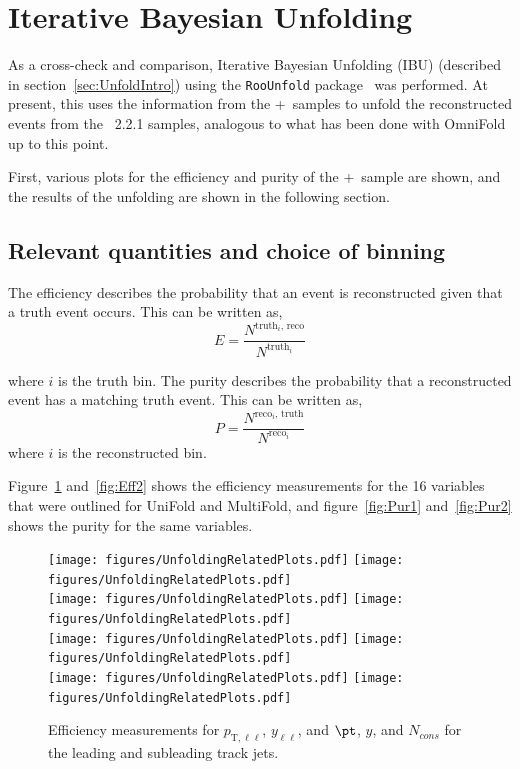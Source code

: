 \section{Iterative Bayesian Unfolding}
\label{app:IBU}

As a cross-check and comparison, %
Iterative Bayesian Unfolding (IBU) (described in section~\ref{sec:UnfoldIntro}) using the \texttt{RooUnfold} package~\cite{Adye:2011gm} was performed. At present, this uses the information from the \powheg+\pythia~samples to unfold the reconstructed events from the \sherpa~2.2.1 samples, analogous to what has been done with OmniFold up to this point.

First, various plots for the efficiency and purity of the \powheg+\pythia~sample are shown, and the results of the unfolding are shown in the following section.

\subsection{Relevant quantities and choice of binning}
The efficiency describes the probability that an event is reconstructed given that a truth event occurs. This can be written as,
\begin{equation}
  E=\frac{N^{\text{truth$_i$, reco}}}{N^{\text{truth$_i$}}}
\end{equation}

where $i$ is the truth bin. The purity describes the probability that a reconstructed event has a matching truth event. This can be written as,
\begin{equation}
  P=\frac{N^{\text{reco$_i$, truth}}}{N^{\text{reco$_i$}}}
\end{equation}
where $i$ is the reconstructed bin.

Figure~\ref{fig:Eff1} and~\ref{fig:Eff2} shows the efficiency measurements for the 16 variables that were outlined for UniFold and MultiFold, and figure~\ref{fig:Pur1} and~\ref{fig:Pur2} shows the purity for the same variables.

\begin{figure}[h!]
  \centering
  \texttt{[image: figures/UnfoldingRelatedPlots.pdf]}
  \texttt{[image: figures/UnfoldingRelatedPlots.pdf]} \\
  \texttt{[image: figures/UnfoldingRelatedPlots.pdf]}
  \texttt{[image: figures/UnfoldingRelatedPlots.pdf]} \\
  \texttt{[image: figures/UnfoldingRelatedPlots.pdf]}
  \texttt{[image: figures/UnfoldingRelatedPlots.pdf]} \\
  \texttt{[image: figures/UnfoldingRelatedPlots.pdf]}
  \texttt{[image: figures/UnfoldingRelatedPlots.pdf]}
  \caption{Efficiency measurements for $p_{\text{T},\ell\ell}$, $y_{\ell\ell}$, and $\pt$, $y$, and $N_{cons}$ for the leading and subleading track jets.}
  \label{fig:Eff1}
\end{figure}

